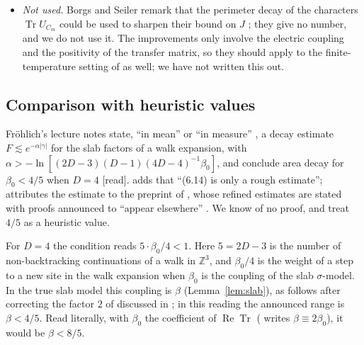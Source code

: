 \documentclass[11pt,a4paper]{article}
\theoremstyle{plain}
\theoremstyle{remark}
\numberwithin{equation}{section}
\newcommand{\Z}{\mathbb{Z}}
\newcommand{\Tr}{\operatorname{Tr}}
\newcommand{\ReTr}{\operatorname{Re}\operatorname{Tr}}
\newcommand{\st}[1]{\textsf{[#1]}}
\begin{document}
\begin{itemize}
with the weights of (I), the certified thresholds of Table~\ref{tab:memory} appear to converge slowly to about $0.82$. Memory $15$
would require about $10^{10}$ orbits. Replacing the worst case of six visited neighbours in Corollary~\ref{cor:site} by the actual
number would give $0.8060$ instead of $0.7824$ at memory $1$; this information is not local along the walk, and we have not found a
finite-memory rule that uses it.
\item \emph{Not used.} Borgs and Seiler remark that the perimeter decay of the characters $\Tr U_{C_m}$ could be used to sharpen
their bound on $J$ \cite[second (B.14), p.~377]{BS83}; they give no number, and we do not use it. The improvements
only involve the electric coupling and the positivity of the transfer matrix, so they should apply to the finite-temperature setting
of \cite{BS83} as well; we have not written this out.
\end{itemize}

\subsection{Comparison with heuristic values}\label{sec:heur}
Fr\"ohlich's lecture notes state, ``in mean'' \cite[p.~24, (6.14)--(6.16)]{Fro80a} or ``in measure'' \cite[p.~20,
(34)--(35)]{Fro80b}, a decay estimate $F\lesssim e^{-\alpha|\gamma|}$ for the slab factors of a walk expansion, with
$\alpha>-\ln[(2D-3)(D-1)(4D-4)^{-1}\beta_0]$, and conclude area decay for $\beta_0<4/5$ when $D=4$ \st{read}. \cite[p.~24]{Fro80a}
adds that ``(6.14) is only a rough estimate''; \cite[p.~20]{Fro80b} attributes the estimate to the preprint of \cite{DF80}, whose refined
estimates are stated with proofs announced to ``appear elsewhere'' \cite[preprint pp.~55, 57]{DF80}. We know of no proof, and treat
$4/5$ as a heuristic value.

For $D=4$ the condition reads $5\cdot\beta_0/4<1$. Here $5=2D-3$ is the number of non-backtracking continuations of a walk in
$\Z^3$, and $\beta_0/4$ is the weight of a step to a new site in the walk expansion when $\beta_0$ is the coupling of the slab
$\sigma$-model. In the true slab model this coupling is $\beta$ (Lemma~\ref{lem:slab}), as follows after correcting the factor $2$ of
\cite{DF80} discussed in \cite[\S7.2]{D7}; in this reading the announced range is $\beta<4/5$. Read literally, with $\beta_0$ the
coefficient of $\ReTr$ (\cite[p.~22]{Fro80b} writes $\beta\equiv2\beta_0$), it would be $\beta<8/5$.
\end{document}
